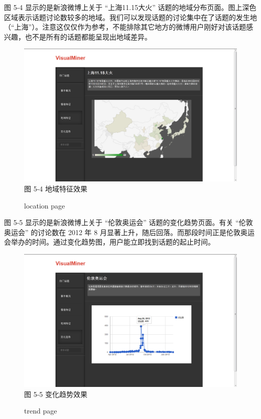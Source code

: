 图 5-4 显示的是新浪微博上关于 “上海11.15大火” 话题的地域分布页面。图上深色区域表示话题讨论数较多的地域。我们可以发现话题的讨论集中在了话题的发生地（“上海”）。注意这仅仅作为参考，不能排除其它地方的微博用户刚好对该话题感兴趣，也不是所有的话题都能呈现出地域差异。
\begin{figure}[!h]
\centering
\includegraphics[width=\textwidth, height=0.35\textheight]{show_location}
图 5-4 地域特征效果
\caption{location page}
\end{figure}

图 5-5 显示的是新浪微博上关于 “伦敦奥运会” 话题的变化趋势页面。有关 “伦敦奥运会” 的讨论数在 2012 年 8 月显著上升，随后回落。而那段时间正是伦敦奥运会举办的时间。通过变化趋势图，用户能立即找到话题的起止时间。

\begin{figure}[!h]
\centering
\includegraphics[width=\textwidth, height=0.4\textheight]{show_time}
图 5-5 变化趋势效果
\caption{trend page}
\end{figure}

